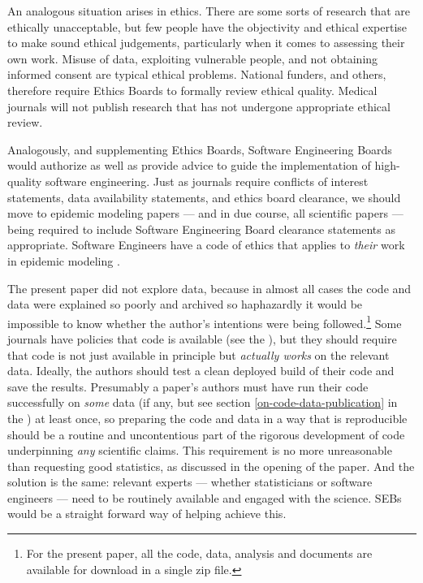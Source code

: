 \documentclass{comjnl}
\begin{document}
An analogous situation arises in ethics. There are some sorts of research that are ethically unacceptable, but few people have the objectivity and ethical expertise to make sound ethical judgements, particularly when it comes to assessing their own work. Misuse of data, exploiting vulnerable people, and not obtaining informed consent are typical ethical problems. National funders, and others, therefore require Ethics Boards to formally review ethical quality. Medical journals will not publish research that has not undergone appropriate ethical review. 

Analogously, and supplementing Ethics Boards, Software Engineering Boards would authorize as well as provide advice to guide the implementation of high-quality software engineering. Just as journals require conflicts of interest statements, data availability statements, and ethics board clearance, we should move to epidemic modeling papers --- and in due course, all scientific papers --- being required to include Software Engineering Board clearance statements as appropriate. {Software Engineers have a code of ethics that applies to \emph{their\/} work in epidemic modeling \cite{ethics-code}.}

{The present paper did not explore data, because in almost all cases the code and data were explained so poorly and archived so haphazardly it would be impossible to know whether the author's intentions were being followed.\footnote{{For the present paper, all the code, data, analysis and documents are available for download in a single zip file.}} Some journals have policies that code is available (see the \supplement), but they should require that code is not just available in principle but \emph{actually works\/} on the relevant data. Ideally, the authors should test a clean deployed build of their code and save the results. Presumably a paper's authors must have run their code successfully on \emph{some\/} data (if any, but see section \ref{on-code-data-publication} in the \supplement) at least once, so preparing the code and data in a way that is reproducible should be a routine and uncontentious part of the rigorous development of  code underpinning \emph{any\/} scientific claims. This requirement is no more unreasonable than requesting good statistics, as discussed in the opening of the paper. And the solution is the same: relevant experts --- whether statisticians or software engineers --- need to be routinely available and engaged with the science. SEBs would be a straight forward way of helping achieve this.}
\end{document}
